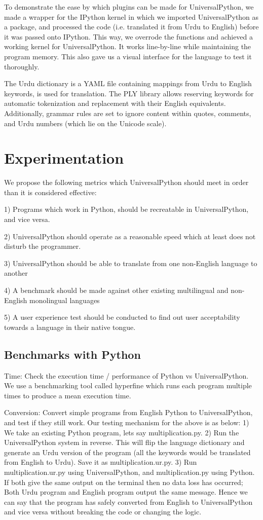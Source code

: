 \documentclass[conference]{IEEEtran}
\begin{document}
To demonstrate the ease by which plugins can be made for UniversalPython, we made a wrapper for the IPython kernel in which we imported UniversalPython as a package, and processed the code (i.e. translated it from Urdu to English) before it was passed onto IPython. This way, we overrode the functions and achieved a working kernel for UniversalPython. It works line-by-line while maintaining the program memory. This also gave us a visual interface for the language to test it thoroughly.

The Urdu dictionary is a YAML file containing mappings from Urdu to English keywords, is used for translation. The PLY library allows reserving keywords for automatic tokenization and replacement with their English equivalents. Additionally, grammar rules are set to ignore content within quotes, comments, and Urdu numbers (which lie on the Unicode scale).

\section{Experimentation}

We propose the following metrics which UniversalPython should meet in order than it is considered effective:

1) Programs which work in Python, should be recreatable in UniversalPython, and vice versa.

2) UniversalPython should operate as a reasonable speed which at least does not disturb the programmer.

3) UniversalPython should be able to translate from one non-English language to another

4) A benchmark should be made against other existing multilingual and non-English monolingual languages

5) A user experience test should be conducted to find out user acceptability towards a language in their native tongue.

\subsection{Benchmarks with Python}\label{AA}

Time: Check the execution time / performance of Python vs UniversalPython. We use a benchmarking tool called hyperfine which runs each program multiple times to produce a mean execution time.

Conversion: Convert simple programs from English Python to UniversalPython, and test if they still work. Our testing mechanism for the above is as below:
1) We take an existing Python program, lets say multiplication.py.
2) Run the UniversalPython system in reverse. This will flip the language dictionary and generate an Urdu version of the program (all the keywords would be translated from English to Urdu). Save it as multiplication.ur.py.
3) Run multiplication.ur.py using UniversalPython, and multiplication.py using Python. If both give the same output on the terminal then no data loss has occurred; Both Urdu program and English program output the same message. Hence we can say that the program has safely converted from English to UniversalPython and vice versa without breaking the code or changing the logic.
\end{document}
